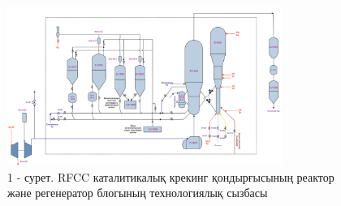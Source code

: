 \begin{figure}[H]
	\centering
	\includegraphics[width=0.8\textwidth]{media/ict/image86}
	\caption*{1 - сурет. RFCC каталитикалық крекинг қондырғысының реактор және
регенератор блогының технологиялық сызбасы}
\end{figure}

